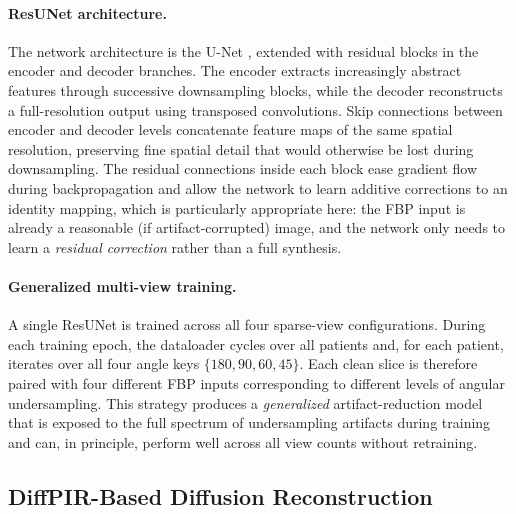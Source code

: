 \documentclass[11pt,a4paper]{article}
\begin{document}
\paragraph{ResUNet architecture.}
The network architecture is the U-Net \cite{ronneberger2015unet}, extended with
residual blocks in the encoder and decoder branches. The encoder extracts
increasingly abstract features through successive downsampling blocks, while the
decoder reconstructs a full-resolution output using transposed convolutions. Skip
connections between encoder and decoder levels concatenate feature maps of the
same spatial resolution, preserving fine spatial detail that would otherwise be
lost during downsampling. The residual connections inside each block ease gradient
flow during backpropagation and allow the network to learn additive corrections
to an identity mapping, which is particularly appropriate here: the FBP input is
already a reasonable (if artifact-corrupted) image, and the network only needs to
learn a \emph{residual correction} rather than a full synthesis.

\paragraph{Generalized multi-view training.}
A single ResUNet is trained across all four sparse-view configurations. During
each training epoch, the dataloader cycles over all patients and, for each
patient, iterates over all four angle keys $\{180, 90, 60, 45\}$. Each clean
slice is therefore paired with four different FBP inputs corresponding to
different levels of angular undersampling. This strategy produces a
\emph{generalized} artifact-reduction model that is exposed to the full spectrum
of undersampling artifacts during training and can, in principle, perform well
across all view counts without retraining.

\subsection{DiffPIR-Based Diffusion Reconstruction}
\end{document}
